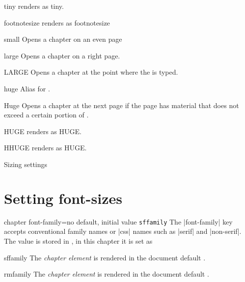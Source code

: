 \begin{marglist}
\item [tiny] renders as {\tiny tiny}.
\item[footnotesize] renders as {\footnotesize footnotesize}
\item [small] Opens a chapter on an even page
\item [large] Opens a chapter on a right page.
\item [LARGE] Opens a chapter at the point where the  is typed.
\item [huge] Alias for .
\item [Huge] Opens a chapter at the next page if the page has material that does not exceed a certain portion of
 .
 \item[HUGE] renders as {\HUGE HUGE}.
 \item[HHUGE] renders as {\HHUGE HUGE}.
\end{marglist}

\begin{texexample}{Sizing settings}{}
\chapter{Setting font-sizes}          
\lorem

\end{texexample}

\begin{docKey}{chapter font-family}{=}{no default, initial value \texttt{sffamily}}
The |font-family| key accepts \latexe conventional family names or |css| names such as |serif| and |non-serif|. The
value is stored in \cmd{\chapterfontfamily@cx}, in this chapter it is set as \makeatletter\chapterfontfamily@cx\makeatother
\end{docKey}

\begin{marglist}
\item [sffamily] The \emph{chapter element} is rendered in the document default \cmd{\sffamily}.
\item [rmfamily] The \emph{chapter element} is rendered in the document default \cmd{\rmfamily}.
\end{marglist}

